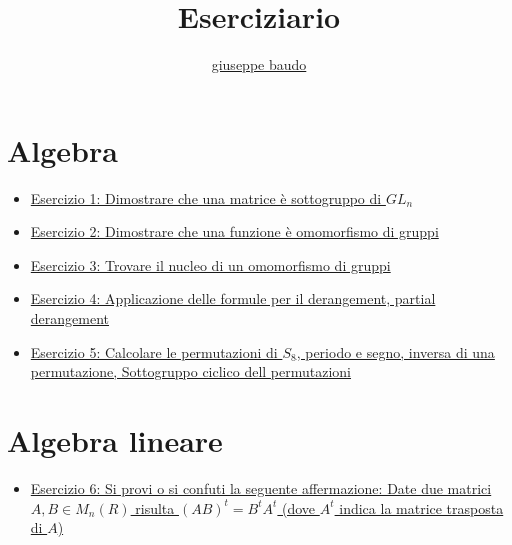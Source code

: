 \documentclass[a4paper,10pt]{article}
\title{Eserciziario}
\author{\href{http://www.baudo.hol.es}{giuseppe baudo}}
\begin{document}
\maketitle

\section{Algebra}
\begin{itemize}
 \item \href{./esercizio1.html}{Esercizio 1: Dimostrare che una matrice è sottogruppo di $GL_{n}$}
 \item \href{./esercizio2.html}{Esercizio 2: Dimostrare che una funzione è omomorfismo di gruppi}
 \item \href{./esercizio3.html}{Esercizio 3: Trovare il nucleo di un omomorfismo di gruppi}
 \item \href{./esercizio4.html}{Esercizio 4: Applicazione delle formule per il derangement, partial derangement}
 \item \href{./esercizio5.html}{Esercizio 5: Calcolare le permutazioni di $S_{8}$, periodo e segno, inversa di una permutazione, Sottogruppo ciclico dell permutazioni}
\end{itemize}

\section{Algebra lineare}
\begin{itemize}
 \item \href{./esercizio6.html}{Esercizio 6: Si provi o si confuti la seguente affermazione: Date due matrici $A, B \in M_n(R)$ risulta $(AB)^t = B^tA^t$ (dove $A^t$ indica la matrice trasposta di $A$)}
\end{itemize}
\end{document}
